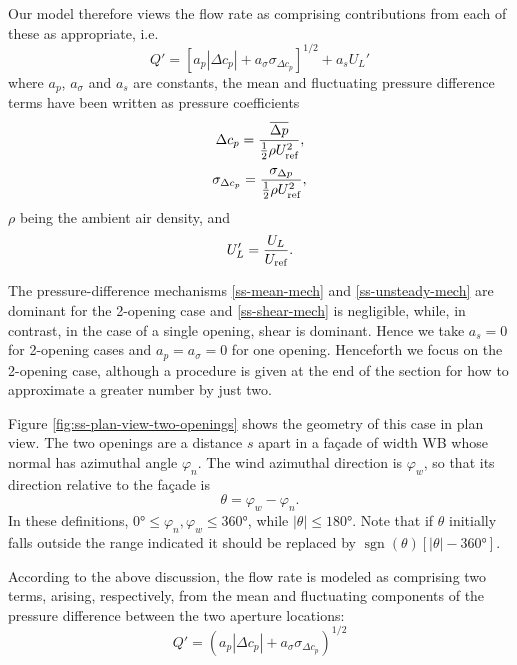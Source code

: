 Our model therefore views the flow rate as comprising contributions from each of these
as appropriate, i.e. 
\begin{equation}
Q'=\left[a_p |\Delta c_p |+a_\sigma \sigma_{\Delta c_p} \right]^{1/2}+a_s U_L'
\end{equation}
where $a_p$, $a_\sigma$ and $a_s$ are constants, the mean and fluctuating pressure
difference terms have been written as pressure coefficients
\begin{equation}
\Delta c_p=\frac{\overline{\Delta p}}{\frac{1}{2} \rho U_\textup{ref}^2},
\end{equation}
\begin{equation}
\sigma_{\Delta c_p}=\frac{\sigma_{\Delta p}}{\frac{1}{2} \rho U_\textup{ref}^2},
\end{equation}
$\rho$ being the ambient air density, and
\begin{equation}
U_L'=\frac{U_L}{U_\textup{ref}}.
\end{equation}

The pressure-difference mechanisms \ref{ss-mean-mech} and \ref{ss-unsteady-mech} are
dominant for the 2-opening case and \ref{ss-shear-mech} is negligible, while, in
contrast, in the case of a single opening, shear is dominant. Hence we take $a_s=0$ for
2-opening cases and $a_p = a_\sigma = 0$ for one opening. Henceforth we focus on the
2-opening case, although a procedure is given at the end of the section for how to
approximate a greater number by just two.

Figure \ref{fig:ss-plan-view-two-openings} shows the geometry of this case in plan view.
The two openings are a distance $s$ apart in a fa\c{c}ade of width WB whose normal has
azimuthal angle $\varphi_n$. The wind azimuthal direction is $\varphi_w$, so that its
direction relative to the fa\c{c}ade is 
\begin{equation}
\theta=\varphi_w-\varphi_n.
\end{equation}
In these definitions, $\ang{0} \leq \varphi_n, \varphi_w \leq \ang{360}$, while
$|\theta| \leq \ang{180}$. Note that if $\theta$ initially falls outside the range
indicated it should be replaced by $\operatorname{sgn}(\theta) \left[|\theta| - \ang{360}\right]$.

According to the above discussion, the flow rate is modeled as comprising two terms,
arising, respectively, from the mean and fluctuating components of the pressure
difference between the two aperture locations:
\begin{equation}\label{eqn:ss-flow-two-terms}
Q'=\left(a_p |\Delta c_p |+a_\sigma \sigma_{\Delta c_p} \right)^{1/2}
\end{equation}


